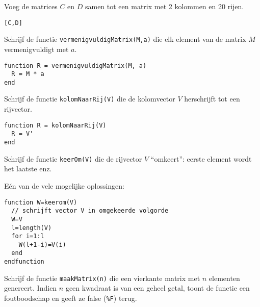 \begin{oef}
Voeg de matrices $C$ en $D$ samen tot een matrix met 2 kolommen en 20 rijen.
\begin{opl}
\begin{lstlisting}
[C,D]
\end{lstlisting}
\end{opl}
\end{oef}

\begin{oef}
Schrijf de functie \texttt{vermenigvuldigMatrix(M,a)} die elk element van de matrix $M$ vermenigvuldigt met $a$.
\begin{opl}
\begin{lstlisting}
function R = vermenigvuldigMatrix(M, a)
  R = M * a
end
\end{lstlisting}
\end{opl}
\end{oef}

\begin{oef}
Schrijf de functie \texttt{kolomNaarRij(V)} die de kolomvector $V$ herschrijft tot een rijvector.
\begin{opl}
\begin{lstlisting}
function R = kolomNaarRij(V)
  R = V'
end
\end{lstlisting}
\end{opl}
\end{oef}

\begin{oef}
Schrijf de functie \texttt{keerOm(V)} die de rijvector $V$ ``omkeert'': eerste element wordt het laatste enz.
\begin{opl}E\'en van de vele mogelijke oplossingen:
\begin{lstlisting}[caption={Een vector omkeren}, label=vectoromkeren]
function W=keerom(V)
  // schrijft vector V in omgekeerde volgorde
  W=V
  l=length(V)
  for i=1:l
    W(l+1-i)=V(i)
  end
endfunction
\end{lstlisting}
\end{opl}
\end{oef}

\begin{oef}
Schrijf de functie \texttt{maakMatrix(n)} die een vierkante matrix met $n$ elementen genereert.
Indien $n$ geen kwadraat is van een geheel getal, toont de functie een foutboodschap en geeft ze {\sc false} (\texttt{\%F}) terug.
\end{oef}
   
